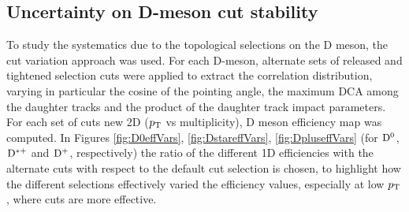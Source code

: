 \subsection{Uncertainty on D-meson cut stability}
To study the systematics due to the topological selections on the D meson, the cut variation approach was used. For each D-meson, alternate sets of released and tightened selection cuts were applied to extract the correlation distribution, varying in particular the cosine of the pointing angle, the maximum DCA among the daughter tracks and the product of the daughter track impact parameters. For each set of cuts new 2D ($p_{\rm T}$ vs multiplicity), D meson efficiency map was computed.
In Figures \ref{fig:D0effVars}, \ref{fig:DstareffVars}, \ref{fig:DpluseffVars} (for ${\rm D^0}$, ${\rm D^{*+}}$ and ${\rm D^+}$, respectively) the ratio of the different 1D efficiencies with the alternate cuts with respect to the default cut selection is chosen, to highlight how the different selections effectively varied the efficiency values, especially at low $p_{\rm T}$, where cuts are more effective.

